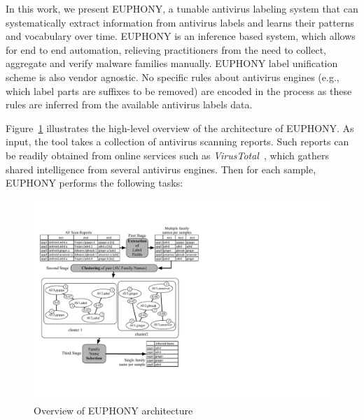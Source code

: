 In this work, we present EUPHONY, a tunable antivirus labeling system that can systematically extract information from antivirus labels and learns their patterns and vocabulary over time.
EUPHONY is an inference based system, which allows for end to end automation, relieving practitioners from the need to collect, aggregate and verify malware families manually.
EUPHONY label unification scheme is also vendor agnostic.
No specific rules about antivirus engines (e.g., which label parts are suffixes to be removed) are encoded in the process as these rules are inferred from the available antivirus labels data.

Figure~\ref{figure:euphony:architecture} illustrates the high-level overview of the architecture of EUPHONY.
As input, the tool takes a collection of antivirus scanning reports.
Such reports can be readily obtained from online services such as {\em VirusTotal}~\cite{noauthor_virustotal_nodate}, which gathers shared intelligence from several antivirus engines.
Then for each sample, EUPHONY performs the following tasks:

\begin{figure}[!ht]
	\centering
	\includegraphics[width=\linewidth]{figures/euphony/architecture04.pdf}
	\caption{Overview of EUPHONY architecture}
	\label{figure:euphony:architecture}
\end{figure}

